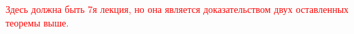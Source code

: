 \textcolor{red}{Здесь должна быть 7я лекция, но она является доказательством двух оставленных теоремы выше.}